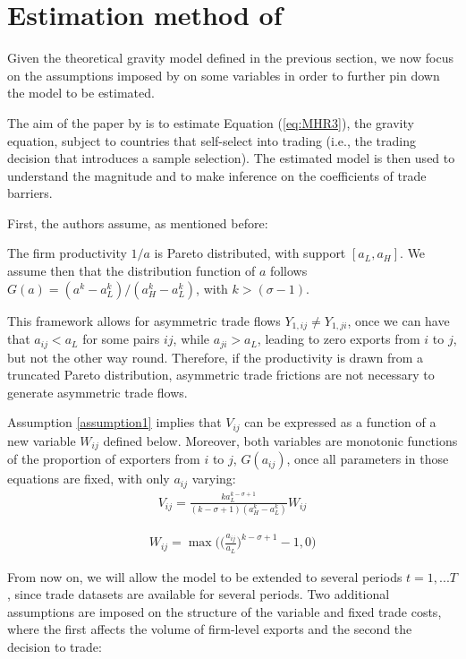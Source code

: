 \section{Estimation method of \cite{helpman2008estimating}} \label{estimating_helpman}
Given the theoretical gravity model defined in the previous section, we now focus on the assumptions imposed by \cite{helpman2008estimating} on some variables in order to further pin down the model to be estimated.

The aim of the paper by \cite{helpman2008estimating} is to estimate Equation (\ref{eq:MHR3}), the gravity equation, subject to countries that self-select into trading (i.e., the trading decision that introduces a sample selection). The estimated model is then used to understand the magnitude and to make inference on the coefficients of trade barriers. 

First, the authors assume, as mentioned before:

\begin{assumption} \label{assumption1}
    The firm productivity $1/a$ is Pareto distributed, with support $[a_L, a_H]$. We assume then that the distribution function of $a$ follows $G(a) = (a^k - a_L^k)/(a_H^k - a_L^k)$, with $k > (\sigma -1)$.
\end{assumption}

This framework allows for asymmetric trade flows $Y_{1,ij} \neq Y_{1,ji}$, once we can have that $a_{ij} < a_L$ for some pairs $ij$, while $a_{ji} > a_L$, leading to zero exports from $i$ to $j$, but not the other way round. Therefore, if the productivity is drawn from a truncated Pareto distribution, asymmetric trade frictions are not necessary to generate asymmetric trade flows.

Assumption \ref{assumption1} implies that $V_{ij}$ can be expressed as a function of a new variable $W_{ij}$ defined below. Moreover, both variables are monotonic functions of the proportion of exporters from $i$ to $j$, $G(a_{ij})$, once all parameters in those equations are fixed, with only $a_{ij}$ varying:
\begin{align*}
    V_{ij} = \frac{k a_L^{k-\sigma + 1}}{(k - \sigma +1)(a_H^k - a_L^k)} W_{ij} 
\end{align*}

\begin{align*}
    W_{ij} = \max \Big(\Big(\frac{a_{ij}}{a_L}\Big)^{k-\sigma +1} -1, 0 \Big)
\end{align*}

From now on, we will allow the model to be extended to several periods $t= 1,...T$, since trade datasets are available for several periods. Two additional assumptions are imposed on the structure of the variable and fixed trade costs, where the first affects the volume of firm-level exports and the second the decision to trade:


